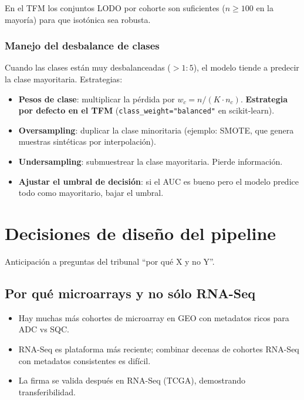 \documentclass[11pt, a4paper]{article}
\begin{document}
En el TFM los conjuntos LODO por cohorte son suficientes ($n \geq 100$
en la mayor\'ia) para que isot\'onica sea robusta.

\subsubsection*{Manejo del desbalance de clases}

Cuando las clases est\'an muy desbalanceadas ($>1:5$), el modelo tiende
a predecir la clase mayoritaria. Estrategias:

\begin{itemize}[leftmargin=1.2em]
  \item \textbf{Pesos de clase}: multiplicar la p\'erdida por
  $w_c = n / (K \cdot n_c)$. \textbf{Estrategia por defecto en el TFM}
  (\texttt{class\_weight="balanced"} en scikit-learn).
  \item \textbf{Oversampling}: duplicar la clase minoritaria (ejemplo:
  SMOTE, que genera muestras sint\'eticas por interpolaci\'on).
  \item \textbf{Undersampling}: submuestrear la clase mayoritaria. Pierde
  informaci\'on.
  \item \textbf{Ajustar el umbral de decisi\'on}: si el AUC es bueno pero
  el modelo predice todo como mayoritario, bajar el umbral.
\end{itemize}

\section{Decisiones de dise\~no del pipeline}

Anticipaci\'on a preguntas del tribunal ``por qu\'e X y no Y''.

\subsection{Por qu\'e microarrays y no s\'olo RNA-Seq}

\begin{itemize}[leftmargin=1.2em]
  \item Hay muchas m\'as cohortes de microarray en GEO con metadatos
  ricos para ADC vs SQC.
  \item RNA-Seq es plataforma m\'as reciente; combinar decenas de
  cohortes RNA-Seq con metadatos consistentes es dif\'icil.
  \item La firma se valida despu\'es en RNA-Seq (TCGA), demostrando
  transferibilidad.
\end{itemize}
\end{document}
